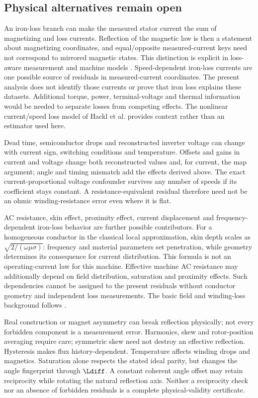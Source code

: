 \subsection{Physical alternatives remain open}
An iron-loss branch can make the measured stator current the sum of
magnetizing and loss currents. Reflection of the magnetic law is then a
statement about magnetizing coordinates, and equal/opposite measured-current
keys need not correspond to mirrored magnetic states. This distinction is
explicit in loss-aware measurement and machine models
\cite{richter2014,kruener2019}. Speed-dependent iron-loss currents are one
possible source of residuals in measured-current coordinates. The present
analysis does not identify those currents or prove that iron loss explains
these datasets. Additional torque, power, terminal-voltage and thermal
information would be needed to separate losses from competing effects.
The nonlinear current/speed loss model of Hackl et al. \cite{hackl2021}
provides context rather than an estimator used here.

Dead time, semiconductor drops and reconstructed inverter voltage can change
with current sign, switching conditions and temperature. Offsets and gains
in current and voltage change both reconstructed values and, for current,
the map argument; angle and timing mismatch add the effects derived above.
The exact current-proportional voltage confounder survives any number of
speeds if its coefficient stays constant. A resistance-equivalent residual
therefore need not be an ohmic winding-resistance error even where it is flat.

AC resistance, skin effect, proximity effect, current displacement and
frequency-dependent iron-loss behavior are further possible contributors.
For a homogeneous conductor in the classical local approximation, skin
depth scales as $\sqrt{2/(\omega\mu\sigma)}$: frequency and material
parameters set penetration, while geometry determines its consequence for
current distribution. This formula is not an operating-current law for this
machine. Effective machine AC resistance may additionally depend on field
distribution, saturation and proximity effects. Such dependencies cannot be
assigned to the present residuals without conductor geometry and independent
loss measurements. The basic field and winding-loss background follows
\cite{binder2017}.

Real construction or magnet asymmetry can break reflection physically;
not every forbidden component is a measurement error. Harmonics, skew and
rotor-position averaging require care; symmetric skew need not destroy
an effective reflection. Hysteresis makes flux history-dependent.
Temperature affects winding drops and magnetics. Saturation alone respects
the stated ideal parity, but changes the angle fingerprint through
$\Ldiff$. A constant coherent angle offset may retain reciprocity while
rotating the natural reflection axis. Neither a reciprocity check nor an
absence of forbidden residuals is a complete physical-validity certificate.

